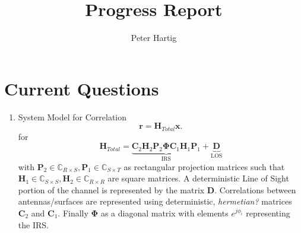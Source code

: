 \documentclass[12pt,a4paper]{report}
\title{Progress Report}
\author{Peter Hartig}
\begin{document}
\maketitle
\tableofcontents

\section{Current Questions}
\begin{enumerate}
\item 
System Model for Correlation 
	 \begin{equation}\label{system_model}
		\mathbf{r} = \mathbf{H}_{Total}\mathbf{x}.
	\end{equation}
	for 
	\begin{equation}
	\mathbf{H}_{Total} =  \underbrace{\mathbf{C}_{2}\mathbf{H}_{2}\mathbf{P}_{2}\boldsymbol{\Phi}\mathbf{C}_{1}\mathbf{H}_{1}\mathbf{P}_{1}}_{\text{IRS}} + \underbrace{\mathbf{D}}_{\text{LOS} }
	\end{equation}
	with $\mathbf{P}_{2}\in \mathbb{C}_{R \times S}, \mathbf{P}_{1}\in \mathbb{C}_{S \times T}$ 
	as rectangular projection matrices such that 
	$\mathbf{H}_{1}\in \mathbb{C}_{S \times S}, \mathbf{H}_{2} \in \mathbb{C}_{R \times R}$ 
	 are square matrices.
	 A deterministic Line of Sight portion of the channel is represented by the matrix $\mathbf{D}$.
	Correlations between antennas/surfaces are represented using deterministic, \emph{hermetian?} matrices
	 $\mathbf{C}_{2} $ and $\mathbf{C}_{1} $. 
	 Finally $\boldsymbol{\Phi}$ as a diagonal matrix with elements $e^{j\phi_i}$ representing the IRS.


\end{enumerate}
\end{document}

